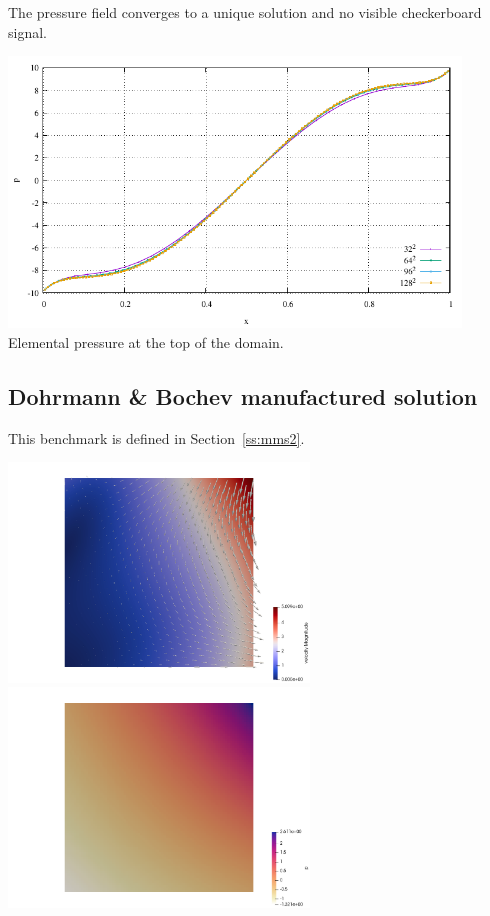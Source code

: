 The pressure field converges to a unique solution and no visible checkerboard signal.
\begin{center}
\includegraphics[width=12cm]{python_codes/fieldstone_80/results/ldc_reg/p_top.pdf}\\
{\captionfont Elemental pressure at the top of the domain.}
\end{center}



\subsection*{Dohrmann \& Bochev manufactured solution}

This benchmark is defined in Section~\ref{ss:mms2}.

\begin{center}
\includegraphics[width=8cm]{python_codes/fieldstone_80/results/db2d/vel}
\includegraphics[width=8cm]{python_codes/fieldstone_80/results/db2d/p}
\end{center}


